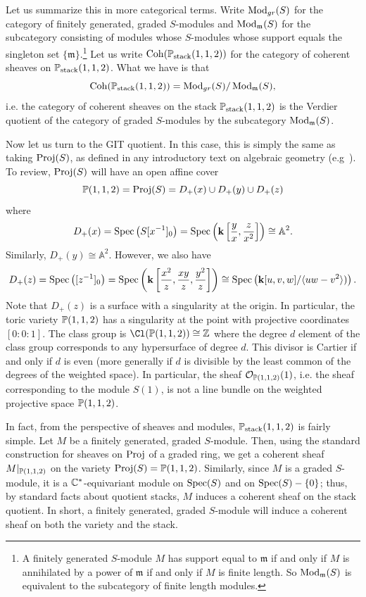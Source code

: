\documentclass{amsart}
\begin{document}
Let us summarize this in more categorical terms.  Write $\operatorname{Mod}_{gr}(S)$ for the category of finitely generated, graded $S$-modules and $\operatorname{Mod}_{\mathfrak m}(S)$ for the subcategory consisting of modules whose $S$-modules whose support equals the singleton set $\{\mathfrak m\}$.\footnote{A finitely generated $S$-module $M$ has support equal to $\mathfrak m$ if and only if $M$ is annihilated by a power of $\mathfrak m$ if and only if $M$ is finite length.  So $\operatorname{Mod}_{\mathfrak m}(S)$ is equivalent to the subcategory of finite length modules.} Let us write $\operatorname{Coh}(\mathbb P_{\text{stack}}(1,1,2) )$ for the category of coherent sheaves on $\mathbb P_{\text{stack}}(1,1,2)$.  What we have is that
\[
\operatorname{Coh}(\mathbb P_{\text{stack}}(1,1,2) ) = \operatorname{Mod}_{gr}(S) / \operatorname{Mod}_{\mathfrak m}(S),
\]
i.e. the category of coherent sheaves on the stack $\mathbb P_{\text{stack}}(1,1,2)$ is the Verdier quotient of the category of graded $S$-modules by the subcategory  $\operatorname{Mod}_{\mathfrak m}(S)$.

Now let us turn to the GIT quotient.  In this case, this is simply the same as taking $\operatorname{Proj}(S)$, as defined in any introductory text on algebraic geometry (e.g~\cite[Chapter 2]{hartshorne}).  To review, $\operatorname{Proj}(S)$ will have an open affine cover
\[
\mathbb P(1,1,2) = \operatorname{Proj}(S) = D_+(x) \cup D_+(y) \cup D_+(z)
\]
where
\[
D_+(x) = \operatorname{Spec}\left(S[x^{-1}]_0\right)=\operatorname{Spec}\left({\bf k}\left[\frac{y}{x}, \frac{z}{x^2}\right]\right) \cong \mathbb A^2.
\]
Similarly, $D_+(y) \cong \mathbb A^2$.  However, we also have
\[
D_+(z) =   \operatorname{Spec}\left([z^{-1}]_0\right)=\operatorname{Spec}\left({\bf k}\left[\frac{x^2}{z}, \frac{xy}{z}, \frac{y^2}{z}\right]\right)\cong \operatorname{Spec}\left({\bf k}[u,v,w] / \langle uw-v^2 \rangle)\right).
\]
Note that $D_+(z)$ is a surface with a singularity at the origin.  In particular, the toric variety $\mathbb P(1,1,2)$ has a singularity at the point with projective coordinates $[0:0:1]$.    The class group is $\Cl(\PP(1,1,2)) \cong \ZZ$ where the degree $d$ element of the class group corresponds to any hypersurface of degree $d$.  This divisor is Cartier if and only if $d$ is even (more generally if $d$ is divisible by the least common of the degrees of the weighted space).
In particular, the sheaf ${\mathcal O}_{\mathbb P(1,1,2)}(1)$, i.e. the sheaf corresponding to the module $S(1)$, is not a line bundle on the weighted projective space $\mathbb P(1,1,2)$.


In fact, from the perspective of sheaves and modules, $\mathbb P_{\text{stack}}(1,1,2)$ is fairly simple.  Let $M$ be a finitely generated, graded $S$-module.  Then, using the standard construction for sheaves on $\operatorname{Proj}$ of a graded ring, we get a  coherent sheaf $M|_{\mathbb P(1,1,2)}$ on the variety $\operatorname{Proj}(S) = \mathbb P(1,1,2)$.  Similarly, since $M$ is a graded $S$-module, it is a $\mathbb{C}^*$-equivariant module on $\operatorname{Spec}(S)$ and on $\operatorname{Spec}(S) - \{0\}$; thus, by standard facts about quotient stacks, $M$ induces a coherent sheaf on the stack quotient.  In short, a finitely generated, graded $S$-module will induce a coherent sheaf on both the variety and the stack.
\end{document}
